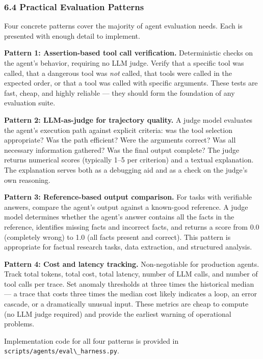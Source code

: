 \documentclass[11pt, a4paper]{article}
\newcommand{\passthrough}[1]{#1}
\begin{document}
\hypertarget{practical-evaluation-patterns}{%
\subsubsection{6.4 Practical Evaluation
Patterns}\label{practical-evaluation-patterns}}

Four concrete patterns cover the majority of agent evaluation needs.
Each is presented with enough detail to implement.

\textbf{Pattern 1: Assertion-based tool call verification.}
Deterministic checks on the agent's behavior, requiring no LLM judge.
Verify that a specific tool was called, that a dangerous tool was
\emph{not} called, that tools were called in the expected order, or that
a tool was called with specific arguments. These tests are fast, cheap,
and highly reliable --- they should form the foundation of any
evaluation suite.

\textbf{Pattern 2: LLM-as-judge for trajectory quality.} A judge model
evaluates the agent's execution path against explicit criteria: was the
tool selection appropriate? Was the path efficient? Were the arguments
correct? Was all necessary information gathered? Was the final output
complete? The judge returns numerical scores (typically 1--5 per
criterion) and a textual explanation. The explanation serves both as a
debugging aid and as a check on the judge's own reasoning.

\textbf{Pattern 3: Reference-based output comparison.} For tasks with
verifiable answers, compare the agent's output against a known-good
reference. A judge model determines whether the agent's answer contains
all the facts in the reference, identifies missing facts and incorrect
facts, and returns a score from 0.0 (completely wrong) to 1.0 (all facts
present and correct). This pattern is appropriate for factual research
tasks, data extraction, and structured analysis.

\textbf{Pattern 4: Cost and latency tracking.} Non-negotiable for
production agents. Track total tokens, total cost, total latency, number
of LLM calls, and number of tool calls per trace. Set anomaly thresholds
at three times the historical median --- a trace that costs three times
the median cost likely indicates a loop, an error cascade, or a
dramatically unusual input. These metrics are cheap to compute (no LLM
judge required) and provide the earliest warning of operational
problems.

Implementation code for all four patterns is provided in
\passthrough{\lstinline!scripts/agents/eval\_harness.py!}.
\end{document}
